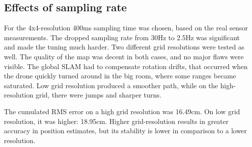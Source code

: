 \documentclass[conference]{IEEEtran}
\begin{document}







\subsection{Effects of sampling rate}

For the 4x4-resolution 400ms sampling time was chosen, based on the real sensor measurements. The dropped 
sampling rate 
from 30Hz to 2.5Hz was significant and made the tuning much harder. Two different grid resolutions were tested 
as well. The quality of the map was decent in both cases, and no major flaws were visible. The global SLAM had to 
compensate rotation drifts, that occurred when the drone quickly turned around in the big room, where some 
ranges became saturated. Low grid resolution produced a smoother path, while on the high-resolution grid, there 
were jumps and sharper turns. 

The cumulated RMS error on a high grid resolution was 16.49cm. On low grid resolution, it was higher: 18.95cm. 
Higher grid-resolution results in greater accuracy in position estimates, but its stability is lower in comparison
to a lower resolution. 
\end{document}
